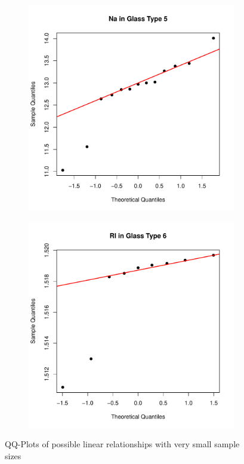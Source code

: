 \documentclass[a4paper, 12pt, titlepage, headsepline, listof = totoc, bibliography = totoc, numbers = noenddot]{scrartcl}
\begin{document}
\begin{figure}[h!]
\centering
\begin{subfigure}{.5\textwidth}
  \centering
  \includegraphics[width=\linewidth]{report-QQsampleslin2a}
  \vspace{-1cm}
  \caption{}
  \label{fig:QQsampleslin2a}
\end{subfigure}%
\begin{subfigure}{.5\textwidth}
  \centering
  \includegraphics[width=\linewidth]{report-QQsampleslin2b}
  \vspace{-1cm}
  \caption{}
  \label{fig:QQsampleslin2b}
\end{subfigure}
\caption{QQ-Plots of possible linear relationships with very small sample sizes}
\label{fig:QQsampleslin2}
\end{figure}
\end{document}
